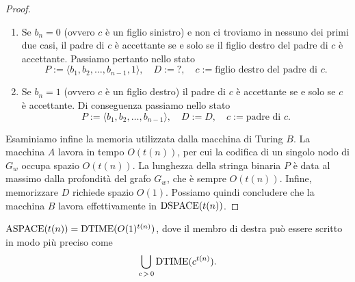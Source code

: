 \begin{proof}
\begin{itemize}
\begin{enumerate}
    \item Se $b_n=0$ (ovvero $c$ è un figlio sinistro) e non ci troviamo in nessuno dei primi due casi,
    il padre di $c$ è accettante se e solo se il figlio destro del padre di $c$ è accettante.
    Passiamo pertanto nello stato
    \[ P := \langle b_1, b_2, \ldots, b_{n-1}, 1 \rangle, \quad D := \texttt{?}, \quad c := \text{figlio destro del padre di $c$}. \]
    
    \item Se $b_n=1$ (ovvero $c$ è un figlio destro) il padre di $c$ è accettante se e solo se $c$ è accettante.
    Di conseguenza passiamo nello stato
    \[ P := \langle b_1, b_2, \ldots, b_{n-1} \rangle, \quad D := D, \quad c := \text{padre di $c$}. \]
  \end{enumerate}
 \end{itemize}

 Esaminiamo infine la memoria utilizzata dalla macchina di Turing $B$.
 La macchina $A$ lavora in tempo $O(t(n))$, per cui la codifica di un singolo nodo di $G_w$ occupa spazio $O(t(n))$.
 La lunghezza della stringa binaria $P$ è data al massimo dalla profondità del grafo $G_w$, che è sempre $O(t(n))$.
 Infine, memorizzare $D$ richiede spazio $O(1)$.
 Possiamo quindi concludere che la macchina $B$ lavora effettivamente in $\operatorname{DSPACE}(t(n))$.
 
\end{proof}


\begin{teorema}
\label{thm:aspace-dtime}
  $\operatorname{ASPACE}(t(n)) = \operatorname{DTIME}(O(1)^{t(n)})$, dove il membro di destra può essere scritto in modo più preciso
   come
   \[ \bigcup_{c\,>\,0} \operatorname{DTIME}(c^{t(n)}). \]
\end{teorema}

